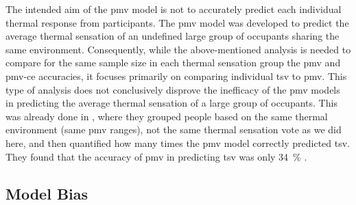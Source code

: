 The intended aim of the \ac{pmv} model is not to accurately predict each individual thermal response from participants.
The \ac{pmv} model was developed to predict the average thermal sensation of an undefined large group of occupants sharing the same environment.
Consequently, while the above-mentioned analysis is needed to compare for the same sample size in each thermal sensation group the \ac{pmv} and \ac{pmv-ce} accuracies, it focuses primarily on comparing individual \ac{tsv} to \ac{pmv}.
This type of analysis does not conclusively disprove the inefficacy of the \ac{pmv} models in predicting the average thermal sensation of a large group of occupants.
This was already done in , where they grouped people based on the same thermal environment (same \ac{pmv} ranges), not the same thermal sensation vote as we did here, and then quantified how many times the \ac{pmv} model correctly predicted \ac{tsv}. 
They found that the accuracy of \ac{pmv} in predicting \ac{tsv} was only \qty{34}{\percent} . 

\subsection{Model Bias}\label{sec:model-bias}

